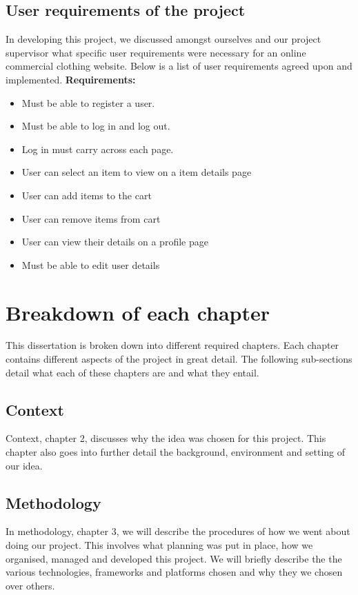 \subsection{User requirements of the project}
In developing this project, we discussed amongst ourselves and our project supervisor what specific user requirements were necessary for an online commercial clothing website. Below is a list of user requirements agreed upon and implemented.
\newline
\newline
\textbf{Requirements:}
\begin{itemize}
  \item Must be able to register a user.
  \item Must be able to log in and log out.
  \item Log in must carry across each page.
  \item User can select an item to view on a item details page
  \item User can add items to the cart
  \item User can remove items from cart
  \item User can view their details on a profile page
  \item Must be able to edit user details
\end{itemize}

\section{Breakdown of each chapter}
This dissertation is broken down into different required chapters. Each chapter contains different aspects of the project in great detail. The following sub-sections detail what each of these chapters are and what they entail.

\subsection{Context}
Context, chapter 2, discusses why the idea was chosen for this project. This chapter also goes into further detail the background, environment and setting of our idea.

\subsection{Methodology}
In methodology, chapter 3, we will describe the procedures of how we went about doing our project. This involves what planning was put in place, how we organised, managed and developed this project. We will briefly describe the the various technologies, frameworks and platforms chosen and why they we chosen over others.

